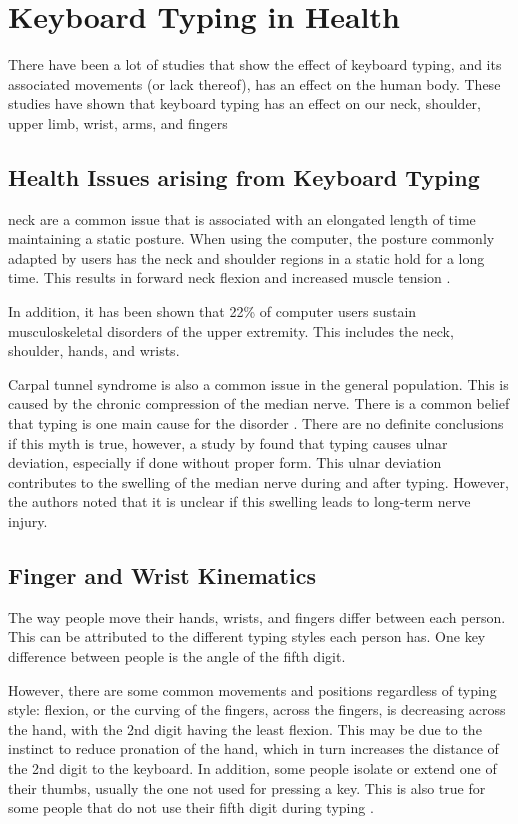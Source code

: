 \documentclass{report}
\begin{document}
\section{Keyboard Typing in Health}

There have been a lot of studies that show the effect of keyboard typing, and
its associated movements (or lack thereof), has an effect on the human body.
These studies have shown that keyboard typing has an effect on our neck, shoulder,
upper limb, wrist, arms, and fingers \parencite{szeto2005, baker2007digit}

\subsection{Health Issues arising from Keyboard Typing}

\ac{neck} are a common issue that is associated with an elongated length of time
maintaining a static posture. When using the computer, the posture commonly
adapted by users has the neck and shoulder regions in a static hold for a long
time. This results in forward neck flexion and increased muscle tension
\parencite{szeto2005}.

In addition, it has been shown that 22\% of computer users sustain
musculoskeletal disorders of the upper extremity. This includes the neck,
shoulder, hands, and wrists. \parencite{gerr2002}

Carpal tunnel syndrome is also a common issue in the general population. This is
caused by the chronic compression of the median nerve. There is a common belief
that typing is one main cause for the disorder \parencite{carpal-myth}. There
are no definite conclusions if this myth is true, however, a study by
\citeauthor{toosi2015} found that typing causes ulnar deviation, especially if
done without proper form. This ulnar deviation contributes to the swelling of
the median nerve during and after typing. However, the authors noted that it is
unclear if this swelling leads to long-term nerve injury.

\subsection{Finger and Wrist Kinematics}
The way people move their hands, wrists, and fingers differ between each person.
This can be attributed to the different typing styles each person has. One key
difference between people is the angle of the fifth digit.

However, there are some common movements and positions regardless of typing
style: flexion, or the curving of the fingers, across the fingers, is decreasing
across the hand, with the 2nd digit having the least flexion. This may be due to
the instinct to reduce pronation of the hand, which in turn increases the
distance of the 2nd digit to the keyboard. In addition, some people isolate or
extend one of their thumbs, usually the one not used for pressing a key. This is
also true for some people that do not use their fifth digit during typing
\parencite{baker2007}.
\end{document}
